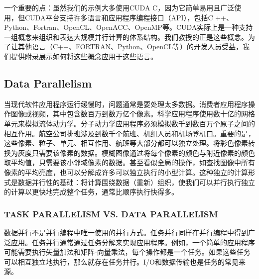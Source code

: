 \documentclass[11pt]{ctexart}
\begin{document}
一个重要的点：虽然我们的示例大多使用CUDA C，因为它简单易用且广泛使用，但CUDA平台支持许多语言和应用程序编程接口（API），包括C ++、Python、Fortran、OpenCL、OpenACC、OpenMP等。CUDA实际上是一种支持一组概念来组织和表达大规模并行计算的体系结构。我们教授的正是这些概念。为了让其他语言（C++、FORTRAN、Python、OpenCL等）的开发人员受益，我们提供附录展示如何将这些概念应用于这些语言。\\
\par\noindent\hrulefill\par %

\subsection{Data Parallelism }

当现代软件应用程序运行缓慢时，问题通常是要处理太多数据。消费者应用程序操作图像或视频，其中包含数百万到数万亿个像素。科学应用程序使用数十亿的网格单元来模拟流体动力学。分子动力学应用程序必须模拟数千到数百万个原子之间的相互作用。航空公司排班涉及到数千个航班、机组人员和机场登机口。重要的是，这些像素、粒子、单元、相互作用、航班等大部分都可以独立处理。将彩色像素转换为灰度只需要该像素的数据。模糊图像通过将每个像素的颜色与附近像素的颜色取平均值，只需要该小邻域像素的数据。甚至看似全局的操作，如查找图像中所有像素的平均亮度，也可以分解成许多可以独立执行的小型计算。这种独立的计算形式是数据并行性的基础：将计算围绕数据（重新）组织，使我们可以并行执行独立的计算以更快地完成整个任务，通常比顺序执行快得多。

\subsubsection{TASK PARALLELISM VS. DATA PARALLELISM}

数据并行不是并行编程中唯一使用的并行方式。任务并行同样在并行编程中得到广泛应用。任务并行通常通过任务分解来实现应用程序。例如，一个简单的应用程序可能需要执行矢量加法和矩阵-向量乘法，每个操作都是一个任务。如果这些任务可以相互独立地执行，那么就存在任务并行。I/O和数据传输也是任务的常见来源。
\end{document}

